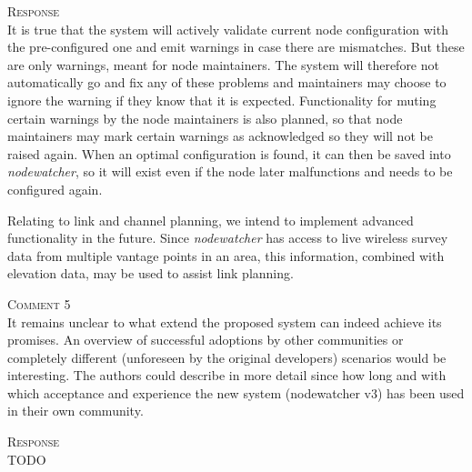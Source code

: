 \documentclass[12pt,twoside,a4paper]{report}
\newcommand{\nodewatcher}{\textit{nodewatcher}}
\begin{document}
\vspace{0.5cm}\noindent\textsc{Response}\\
It is true that the system will actively validate current node configuration with the pre-configured one and emit warnings in case there are mismatches.
But these are only warnings, meant for node maintainers.
The system will therefore not automatically go and fix any of these problems and maintainers may choose to ignore the warning if they know that it is expected.
Functionality for muting certain warnings by the node maintainers is also planned, so that node maintainers may mark certain warnings as acknowledged so they will not be raised again.
When an optimal configuration is found, it can then be saved into \nodewatcher{}, so it will exist even if the node later malfunctions and needs to be configured again.

Relating to link and channel planning, we intend to implement advanced functionality in the future.
Since \nodewatcher{} has access to live wireless survey data from multiple vantage points in an area, this information, combined with elevation data, may be used to assist link planning.

\vspace{0.5cm}\noindent\textsc{Comment 5}\\
It remains unclear to what extend the proposed system can indeed achieve its promises. An overview of successful adoptions by other communities or completely different (unforeseen by the original developers) scenarios would be interesting. The authors could describe in more detail since how long and with which acceptance and experience the new system (nodewatcher v3) has been used in their own community.

\vspace{0.5cm}\noindent\textsc{Response}\\
TODO
\end{document}
